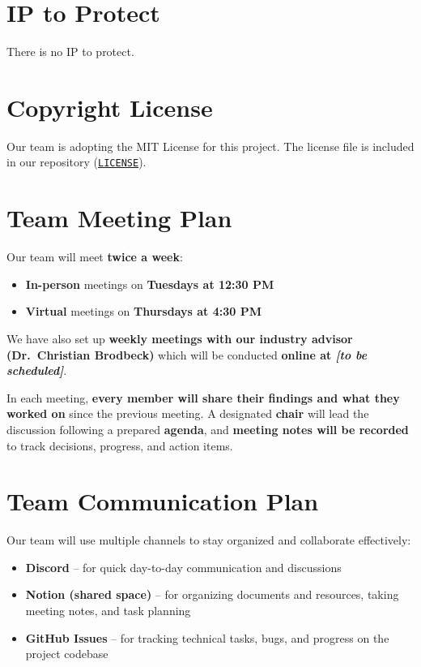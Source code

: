 \documentclass{article}
\begin{document}
\section{IP to Protect}



There is no IP to protect.

\section{Copyright License}

Our team is adopting the MIT License for this project. The license file is included in our repository 
(\href{https://github.com/speech-buddies/VoiceBridge/blob/main/LICENSE}{\texttt{LICENSE}}).

\section{Team Meeting Plan}

Our team will meet \textbf{twice a week}:

\begin{itemize}
    \item \textbf{In-person} meetings on \textbf{Tuesdays at 12:30 PM}
    \item \textbf{Virtual} meetings on \textbf{Thursdays at 4:30 PM}
\end{itemize}

We have also set up \textbf{weekly meetings with our industry advisor (Dr.~Christian Brodbeck)} which will be conducted \textbf{online at \textit{[to be scheduled]}}.

In each meeting, \textbf{every member will share their findings and what they worked on} since the previous meeting. A designated \textbf{chair} will lead the discussion following a prepared \textbf{agenda}, and \textbf{meeting notes will be recorded} to track decisions, progress, and action items.

\section{Team Communication Plan}

Our team will use multiple channels to stay organized and collaborate effectively:

\begin{itemize}
    \item \textbf{Discord} – for quick day-to-day communication and discussions
    \item \textbf{Notion (shared space)} – for organizing documents and resources, taking meeting notes, and task planning
    \item \textbf{GitHub Issues} – for tracking technical tasks, bugs, and progress on the project codebase
\end{itemize}
\end{document}
